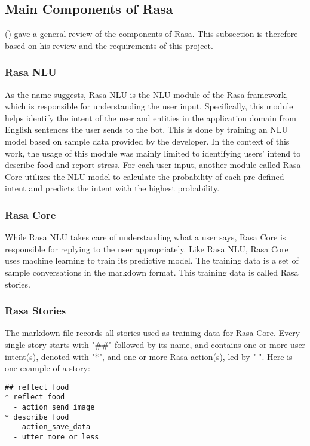 \subsection{Main Components of Rasa}
\citeauthor{16_martin} (\citeyear{17_ludwig}) gave a general review of the components of Rasa. This subsection is therefore based on his review and the requirements of this project.

\subsubsection{Rasa NLU}
As the name suggests, Rasa NLU is the NLU module of the Rasa framework, which is responsible for understanding the user input. Specifically, this module helps identify the intent of the user and entities in the application domain from English sentences the user sends to the bot. This is done by training an NLU model based on sample data provided by the developer. In the context of this work, the usage of this module was mainly limited to identifying users' intend to describe food and report stress. For each user input, another module called Rasa Core utilizes the NLU model to calculate the probability of each pre-defined intent and predicts the intent with the highest probability.

\subsubsection{Rasa Core}
While Rasa NLU takes care of understanding what a user says, Rasa Core is responsible for replying to the user appropriately. Like Rasa NLU, Rasa Core uses machine learning to train its predictive model. The training data is a set of sample conversations in the markdown format. This training data is called Rasa stories.

\subsubsection{Rasa Stories}
The markdown file records all stories used as training data for Rasa Core. Every single story starts with "\#\#" followed by its name, and contains one or more user intent(s), denoted with "*", and one or more Rasa action(s), led by "-". Here is one example of a story:\bigskip

\begin{lstlisting}
## reflect food
* reflect_food
  - action_send_image
* describe_food
  - action_save_data
  - utter_more_or_less
\end{lstlisting}

